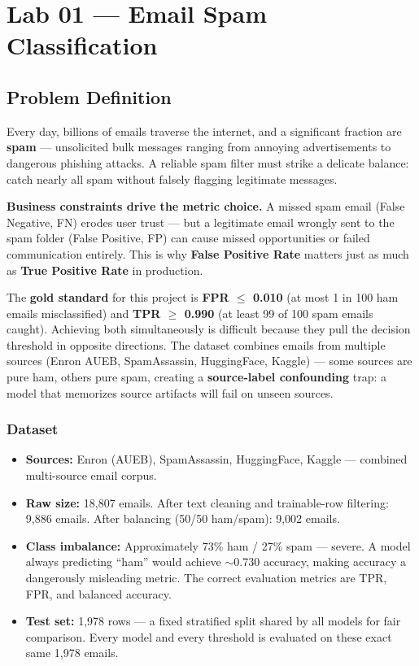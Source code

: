\chapter{Lab 01 — Email Spam Classification}
\label{ch:lab01}

\section{Problem Definition}

\begin{problembox}
Every day, billions of emails traverse the internet, and a significant fraction are \textbf{spam} — unsolicited bulk messages ranging from annoying advertisements to dangerous phishing attacks. A reliable spam filter must strike a delicate balance: catch nearly all spam without falsely flagging legitimate messages.

\textbf{Business constraints drive the metric choice.} A missed spam email (False Negative, FN) erodes user trust — but a legitimate email wrongly sent to the spam folder (False Positive, FP) can cause missed opportunities or failed communication entirely. This is why \textbf{False Positive Rate} matters just as much as \textbf{True Positive Rate} in production.

The \textbf{gold standard} for this project is \textbf{FPR $\le$ 0.010} (at most 1 in 100 ham emails misclassified) and \textbf{TPR $\ge$ 0.990} (at least 99 of 100 spam emails caught). Achieving both simultaneously is difficult because they pull the decision threshold in opposite directions. The dataset combines emails from multiple sources (Enron AUEB, SpamAssassin, HuggingFace, Kaggle) — some sources are pure ham, others pure spam, creating a \textbf{source-label confounding} trap: a model that memorizes source artifacts will fail on unseen sources.
\end{problembox}

\subsection{Dataset}
\begin{itemize}
  \item \textbf{Sources:} Enron (AUEB), SpamAssassin, HuggingFace, Kaggle — combined multi-source email corpus.
  \item \textbf{Raw size:} 18,807 emails. After text cleaning and trainable-row filtering: 9,886 emails. After balancing (50/50 ham/spam): 9,002 emails.
  \item \textbf{Class imbalance:} Approximately 73\% ham / 27\% spam — severe. A model always predicting ``ham'' would achieve $\sim$0.730 accuracy, making accuracy a dangerously misleading metric. The correct evaluation metrics are TPR, FPR, and balanced accuracy.
  \item \textbf{Test set:} 1,978 rows — a fixed stratified split shared by all models for fair comparison. Every model and every threshold is evaluated on these exact same 1,978 emails.
\end{itemize}

